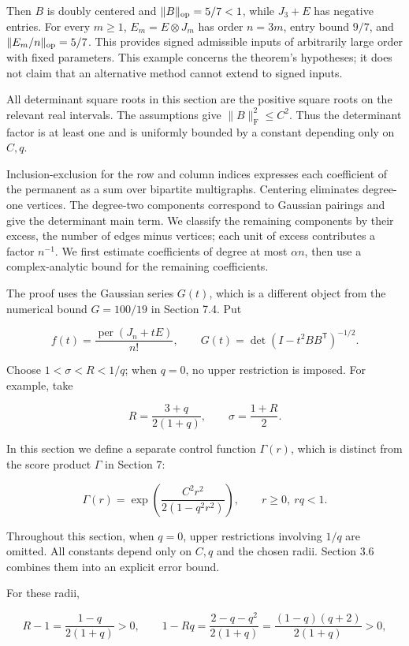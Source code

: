 \documentclass[11pt,a4paper]{article}
\begin{document}
Then \(B\) is doubly centered and \(\|B\|_{\rm op}=5/7<1\), while \(J_3+E\) has negative entries. For every \(m\ge1\), \(E_m=E\otimes J_m\) has order \(n=3m\), entry bound \(9/7\), and \(\|E_m/n\|_{\rm op}=5/7\). This provides signed admissible inputs of arbitrarily large order with fixed parameters. This example concerns the theorem's hypotheses; it does not claim that an alternative method cannot extend to signed inputs.

All determinant square roots in this section are the positive square roots on the relevant real intervals. The assumptions give \(\|B\|_{\mathrm F}^2\le C^2\). Thus the determinant factor is at least one and is uniformly bounded by a constant depending only on \(C,q\).

Inclusion-exclusion for the row and column indices expresses each coefficient of the permanent as a sum over bipartite multigraphs. Centering eliminates degree-one vertices. The degree-two components correspond to Gaussian pairings and give the determinant main term. We classify the remaining components by their excess, the number of edges minus vertices; each unit of excess contributes a factor \(n^{-1}\). We first estimate coefficients of degree at most \(\alpha n\), then use a complex-analytic bound for the remaining coefficients.

The proof uses the Gaussian series \(G(t)\), which is a different object from the numerical bound \(G=100/19\) in Section 7.4. Put

\[
f(t)=\frac{\operatorname{per}(J_n+tE)}{n!},
\qquad G(t)=\det(I-t^2BB^{\mathsf T})^{-1/2}.
\]

Choose \(1<\sigma<R<1/q\); when \(q=0\), no upper restriction is imposed. For example, take

\[
R=\frac{3+q}{2(1+q)},\qquad \sigma=\frac{1+R}{2}.
\]

In this section we define a separate control function \(\Gamma(r)\), which is distinct from the score product \(\Gamma\) in Section 7:

\[
\Gamma(r)=\exp\left(\frac{C^2r^2}{2(1-q^2r^2)}\right),
\qquad r\ge0,\ rq<1.
\]

Throughout this section, when \(q=0\), upper restrictions involving \(1/q\) are omitted. All constants depend only on \(C,q\) and the chosen radii. Section 3.6 combines them into an explicit error bound.

For these radii,

\[
R-1=\frac{1-q}{2(1+q)}>0,\qquad
1-Rq=\frac{2-q-q^2}{2(1+q)}=\frac{(1-q)(q+2)}{2(1+q)}>0,
\]
\end{document}
